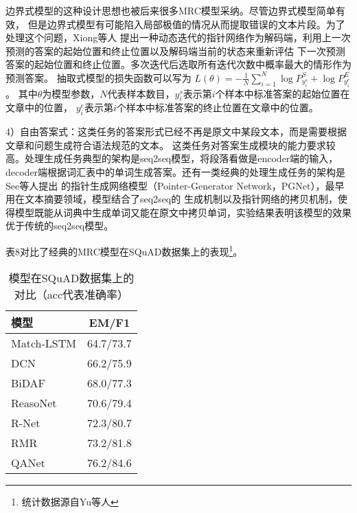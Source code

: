 边界式模型的这种设计思想也被后来很多MRC模型采纳。尽管边界式模型简单有效，
但是边界式模型有可能陷入局部极值的情况从而提取错误的文本片段。为了处理这个问题，Xiong等人
提出一种动态迭代的指针网络作为解码端，利用上一次预测的答案的起始位置和终止位置以及解码端当前的状态来重新评估
下一次预测答案的起始位置和终止位置。多次迭代后选取所有迭代次数中概率最大的情形作为预测答案。
抽取式模型的损失函数可以写为
$L(\theta)=-\displaystyle\frac{1}{N}\sum_{i=1}^{N}\log P_{y_i^s}^S+\log P_{y_i^e}^E$。
其中$\theta$为模型参数，$N$代表样本数目，$y_i^s$表示第$i$个样本中标准答案的起始位置在文章中的位置，
$y_i^e$表示第$i$个样本中标准答案的终止位置在文章中的位置。

4）自由答案式：这类任务的答案形式已经不再是原文中某段文本，而是需要根据文章和问题生成符合语法规范的文本。
这类任务对答案生成模块的能力要求较高。处理生成任务典型的架构是seq2seq模型，将段落看做是encoder端的输入，decoder端根据词汇表中的单词生成答案。还有一类经典的处理生成任务的架构是See等人提出
的指针生成网络模型（Pointer-Generator Network，PGNet），最早用在文本摘要领域，模型结合了seq2seq的
生成机制以及指针网络的拷贝机制，使得模型既能从词典中生成单词又能在原文中拷贝单词，实验结果表明该模型的效果优于传统的seq2seq模型。

表8对比了经典的MRC模型在SQuAD数据集上的表现\footnote{统计数据源自Yu等人}。


\begin{table}[ht]
	\centering
	\caption{模型在SQuAD数据集上的对比（acc代表准确率）}
	\begin{tabular}{l c}
		\toprule
		模型&EM/F1\\
		\midrule
		Match-LSTM\upcite{MatchLSTM}& 64.7/73.7\\
		\midrule
		DCN\upcite{DCN}& 66.2/75.9\\
		\midrule
		BiDAF\upcite{BiDAF}&68.0/77.3\\
		\midrule
		ReasoNet\upcite{Reasonet}&70.6/79.4\\
		\midrule
		R-Net\upcite{RNet}&72.3/80.7 \\
		\midrule
		RMR\upcite{RMR}&73.2/81.8 \\
		\midrule
		QANet\upcite{QANet}& 76.2/84.6\\
		\bottomrule
	\end{tabular}
\end{table}